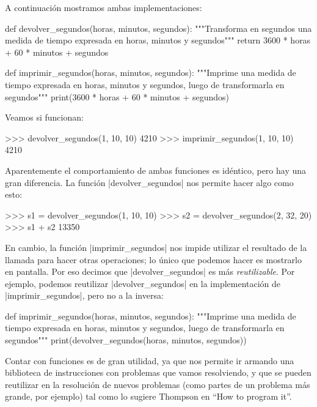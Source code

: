 A continuación mostramos ambas implementaciones:

\begin{codigo-python-sn}
def devolver_segundos(horas, minutos, segundos):
    """Transforma en segundos una medida de tiempo expresada en
       horas, minutos y segundos"""
    return 3600 * horas + 60 * minutos + segundos

def imprimir_segundos(horas, minutos, segundos):
    """Imprime una medida de tiempo expresada en horas, minutos y
       segundos, luego de transformarla en segundos"""
    print(3600 * horas + 60 * minutos + segundos)
\end{codigo-python-sn}

Veamos si funcionan:

\begin{codigo-python-sn}
>>> devolver_segundos(1, 10, 10)
4210
>>> imprimir_segundos(1, 10, 10)
4210
\end{codigo-python-sn}

Aparentemente el comportamiento de ambas funciones es idéntico, pero hay una
gran diferencia. La función |devolver_segundos| nos permite hacer algo como
esto:

\begin{codigo-python-sn}
>>> s1 = devolver_segundos(1, 10, 10)
>>> s2 = devolver_segundos(2, 32, 20)
>>> s1 + s2
13350
\end{codigo-python-sn}

En cambio, la función |imprimir_segundos| nos impide utilizar el resultado de
la llamada para hacer otras operaciones; lo único que podemos hacer es
mostrarlo en pantalla. Por eso decimos que |devolver_segundos| es más {\it
reutilizable}. Por ejemplo, podemos reutilizar |devolver_segundos| en la
implementación de |imprimir_segundos|, pero no a la inversa:

\begin{codigo-python-sn}
def imprimir_segundos(horas, minutos, segundos):
    """Imprime una medida de tiempo expresada en horas, minutos y
       segundos, luego de transformarla en segundos"""
    print(devolver_segundos(horas, minutos, segundos))
\end{codigo-python-sn}

Contar con funciones es de gran utilidad, ya que nos permite ir armando una
biblioteca de instrucciones con problemas que vamos resolviendo, y que se
pueden reutilizar en la resolución de nuevos problemas (como partes de un
problema más grande, por ejemplo) tal como lo sugiere Thompson en ``How to
program it''.

